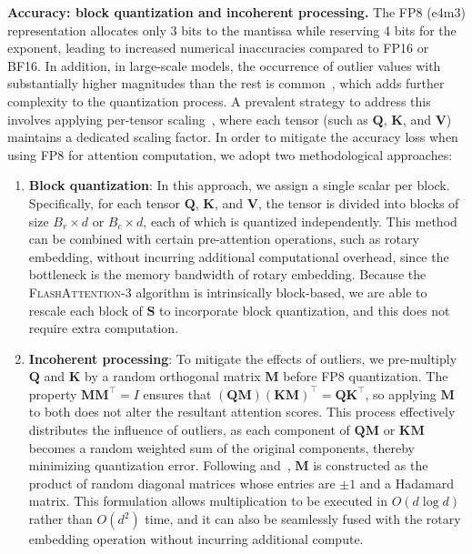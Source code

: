 \begin{enumerate}
\textbf{Accuracy: block quantization and incoherent processing.} The FP8 (e4m3) representation allocates only 3 bits to the mantissa while reserving 4 bits for the exponent, leading to increased numerical inaccuracies compared to FP16 or BF16. In addition, in large-scale models, the occurrence of outlier values with substantially higher magnitudes than the rest is common~\citep{dettmers2208llm, sun2024massive}, which adds further complexity to the quantization process. A prevalent strategy to address this involves applying per-tensor scaling~\citep{micikevicius2022fp8}, where each tensor (such as $\mathbf{Q}$, $\mathbf{K}$, and $\mathbf{V}$) maintains a dedicated scaling factor. In order to mitigate the accuracy loss when using FP8 for attention computation, we adopt two methodological approaches:

\begin{enumerate}

\item \textbf{Block quantization}: In this approach, we assign a single scalar per block. Specifically, for each tensor $\mathbf{Q}$, $\mathbf{K}$, and $\mathbf{V}$, the tensor is divided into blocks of size $B_r \times d$ or $B_c \times d$, each of which is quantized independently. This method can be combined with certain pre-attention operations, such as rotary embedding, without incurring additional computational overhead, since the bottleneck is the memory bandwidth of rotary embedding. Because the \textsc{FlashAttention-3} algorithm is intrinsically block-based, we are able to rescale each block of $\mathbf{S}$ to incorporate block quantization, and this does not require extra computation.

\item \textbf{Incoherent processing}: To mitigate the effects of outliers, we pre-multiply $\mathbf{Q}$ and $\mathbf{K}$ by a random orthogonal matrix $\mathbf{M}$ before FP8 quantization. The property $\mathbf{M} \mathbf{M}^\top = I$ ensures that $(\mathbf{Q} \mathbf{M}) (\mathbf{K} \mathbf{M})^\top = \mathbf{Q} \mathbf{K}^\top$, so applying $\mathbf{M}$ to both does not alter the resultant attention scores. This process effectively distributes the influence of outliers, as each component of $\mathbf{Q} \mathbf{M}$ or $\mathbf{K} \mathbf{M}$ becomes a random weighted sum of the original components, thereby minimizing quantization error. Following \citet{chee2024quip} and~\citet{tseng2024quip}, $\mathbf{M}$ is constructed as the product of random diagonal matrices whose entries are $\pm 1$ and a Hadamard matrix. This formulation allows multiplication to be executed in $O(d \log d)$ rather than $O(d^2)$ time, and it can also be seamlessly fused with the rotary embedding operation without incurring additional compute.


\end{enumerate}
\end{enumerate}
